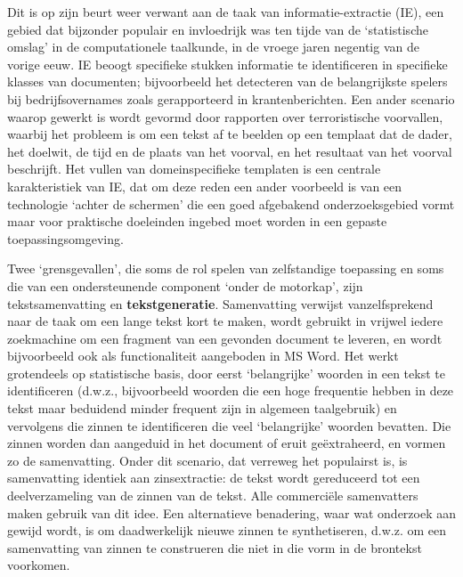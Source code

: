 \documentclass[]{../../metanetpaper}
\begin{document}
\begin{multicols}{2}

    Dit is op zijn beurt weer verwant aan de taak van informatie-extractie (IE), een gebied dat bijzonder populair en invloedrijk was ten tijde van de `statistische omslag' in de computationele taalkunde, in de vroege jaren negentig van de vorige eeuw. IE beoogt specifieke stukken informatie te identificeren in specifieke klasses van documenten; bijvoorbeeld het detecteren van de belangrijkste spelers bij bedrijfsovernames zoals gerapporteerd in krantenberichten. Een ander scenario waarop gewerkt is wordt gevormd door rapporten over terroristische voorvallen, waarbij het probleem is om een tekst af te beelden op een templaat dat de dader, het doelwit, de tijd en de plaats van het voorval, en het resultaat van het voorval beschrijft. Het vullen van domeinspecifieke templaten is een centrale karakteristiek van IE, dat om deze reden een ander voorbeeld is van een technologie `achter de schermen' die een goed afgebakend onderzoeksgebied vormt maar voor praktische doeleinden ingebed moet worden in een gepaste toepassingsomgeving.

    Twee `grensgevallen', die soms de rol spelen van zelfstandige toepassing en soms die van een ondersteunende component `onder de motorkap', zijn tekstsamenvatting en \textbf{tekstgeneratie}. Samenvatting verwijst vanzelfsprekend naar de taak om een lange tekst kort te maken, wordt gebruikt in vrijwel iedere zoekmachine om een fragment van een gevonden document te leveren, en wordt bijvoorbeeld ook als functionaliteit aangeboden in MS Word. Het werkt grotendeels op statistische basis, door eerst `belangrijke' woorden in een tekst te identificeren (d.w.z., bijvoorbeeld woorden die een hoge frequentie hebben in deze tekst maar beduidend minder frequent zijn in algemeen taalgebruik) en vervolgens die zinnen te identificeren die veel `belangrijke' woorden bevatten. Die zinnen worden dan aangeduid in het document of eruit ge{\"e}xtraheerd, en vormen zo de samenvatting. Onder dit scenario, dat verreweg het populairst is, is samenvatting identiek aan zinsextractie: de tekst wordt gereduceerd tot een deelverzameling van de zinnen van de tekst. Alle commerci{\"e}le samenvatters maken gebruik van dit idee. Een alternatieve benadering, waar wat onderzoek aan gewijd wordt, is om daadwerkelijk nieuwe zinnen te synthetiseren, d.w.z. om een samenvatting van zinnen te construeren die niet in die vorm in de brontekst voorkomen. 


\end{multicols}
\end{document}
